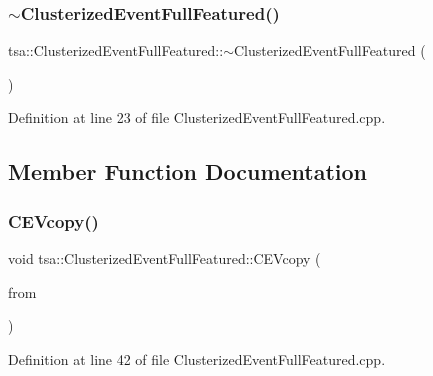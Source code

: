 \subsubsection{\texorpdfstring{$\sim$\+Clusterized\+Event\+Full\+Featured()}{~ClusterizedEventFullFeatured()}}
{\footnotesize\ttfamily tsa\+::\+Clusterized\+Event\+Full\+Featured\+::$\sim$\+Clusterized\+Event\+Full\+Featured (\begin{DoxyParamCaption}{ }\end{DoxyParamCaption})\hspace{0.3cm}{\ttfamily [virtual]}}



Definition at line 23 of file Clusterized\+Event\+Full\+Featured.\+cpp.



\subsection{Member Function Documentation}
\mbox{\label{classtsa_1_1_clusterized_event_full_featured_aa727b57615697f74fb48a639b0305cd0}} 
\subsubsection{\texorpdfstring{C\+E\+Vcopy()}{CEVcopy()}}
{\footnotesize\ttfamily void tsa\+::\+Clusterized\+Event\+Full\+Featured\+::\+C\+E\+Vcopy (\begin{DoxyParamCaption}\item[{const \hyperlink{classtsa_1_1_clusterized_event_full_featured}{Clusterized\+Event\+Full\+Featured} \&}]{from }\end{DoxyParamCaption})}



Definition at line 42 of file Clusterized\+Event\+Full\+Featured.\+cpp.

\mbox{\label{classtsa_1_1_clusterized_event_full_featured_afb655951c1bae9f57597fbe05bbea620}} 

